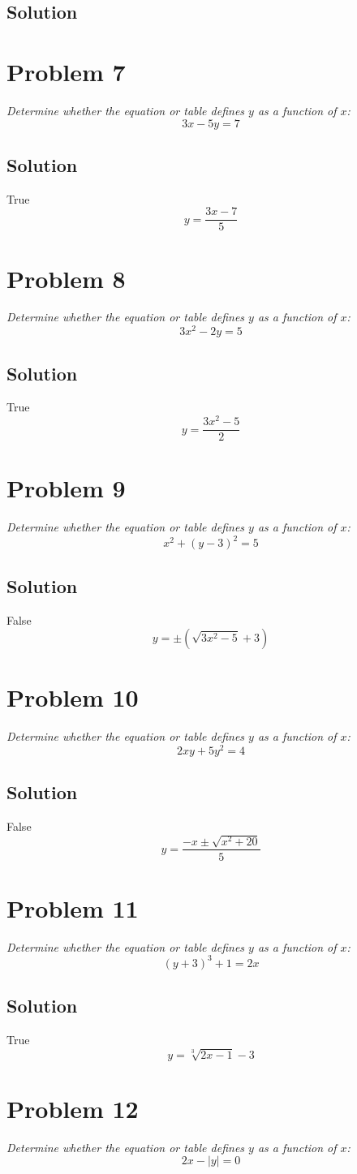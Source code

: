 \documentclass[11pt]{article}
\newcommand{\soln}{\subsection*}
\newcommand{\qn}{\textit}
\begin{document}
\soln{Solution}

\section*{Problem 7}

\qn{Determine whether the equation or table defines $y$ as a function of $x$: $$3x-5y=7$$}

\soln{Solution}
True
$$y=\frac{3x-7}{5}$$

\section*{Problem 8}

\qn{Determine whether the equation or table defines $y$ as a function of $x$: $$3x^2-2y=5$$}

\soln{Solution}
True
$$y=\frac{3x^2-5}{2}$$

\section*{Problem 9}

\qn{Determine whether the equation or table defines $y$ as a function of $x$: $$x^2+(y-3)^2=5$$}

\soln{Solution}
False
$$y=\pm(\sqrt{3x^2-5}+3)$$

\section*{Problem 10}

\qn{Determine whether the equation or table defines $y$ as a function of $x$: $$2xy+5y^2=4$$}

\soln{Solution}
False
$$y=\frac{-x\pm\sqrt{x^2+20}}{5}$$

\section*{Problem 11}

\qn{Determine whether the equation or table defines $y$ as a function of $x$: $$(y+3)^3+1=2x$$}

\soln{Solution}
True
$$y=\sqrt[3]{2x-1}-3$$

\section*{Problem 12}

\qn{Determine whether the equation or table defines $y$ as a function of $x$: $$2x-|y|=0$$}
\end{document}
